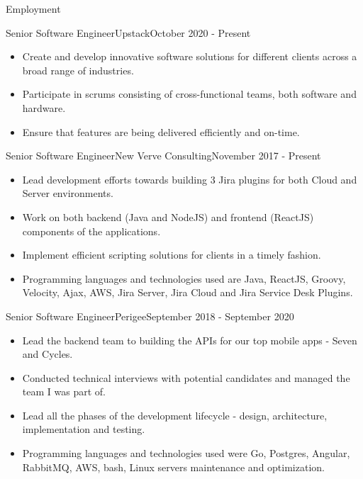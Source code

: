 \documentclass[]{cv}
\begin{document}
	\makeheader
	
	\begin{cvsection}{Employment}
		\begin{cvsubsection}{Senior Software Engineer}{Upstack}{October 2020 - Present }
			\begin{itemize}
				\item Create and develop innovative software solutions for different clients across a broad range of industries. 
				\item Participate in scrums consisting of cross-functional teams, both software and hardware. 
				\item Ensure that features are being delivered efficiently and on-time. 
			\end{itemize}
		\end{cvsubsection}

		\begin{cvsubsection}{Senior Software Engineer}{New Verve Consulting}{November 2017 - Present }
			\begin{itemize}
				\item Lead development efforts towards building 3 Jira plugins for both Cloud and Server environments.
				\item Work on both backend (Java and NodeJS) and frontend (ReactJS) components of the applications.
				\item Implement efficient scripting solutions for clients in a timely fashion.
				\item Programming languages and technologies used are Java, ReactJS, Groovy, Velocity, Ajax, AWS, 
				Jira Server, Jira Cloud and Jira Service Desk Plugins.
			\end{itemize}
		\end{cvsubsection}

		\begin{cvsubsection}{Senior Software Engineer}{Perigee}{September 2018 - September 2020}
			\begin{itemize}
				\item Lead the backend team to building the APIs for our top mobile apps - Seven and Cycles.
				\item Conducted technical interviews with potential candidates and managed the team I was part of.
				\item Lead all the phases of the development lifecycle - design, architecture, implementation and testing.
				\item Programming languages and technologies used were Go, Postgres, Angular, RabbitMQ, AWS, bash, Linux servers maintenance and optimization.
			\end{itemize}
		\end{cvsubsection}
		

\end{cvsection}
\end{document}
